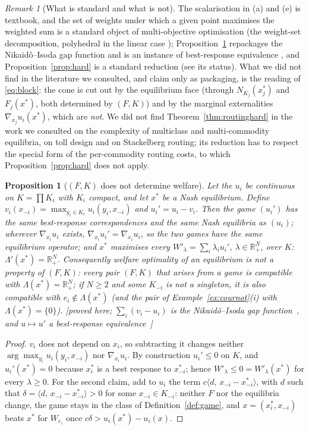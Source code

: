 \documentclass[11pt,a4paper]{article}
\theoremstyle{plain}
\newtheorem{proposition}[theorem]{Proposition}
\theoremstyle{definition}
\theoremstyle{remark}
\newtheorem{remark}[theorem]{Remark}
\newcommand{\R}{\mathbb{R}}
\newcommand{\NC}{N}
\newcommand{\ip}[2]{\langle #1,\,#2\rangle}
\newcommand{\status}[1]{\textsf{\small [#1]}}
\newcommand{\Lam}{\Lambda}
\begin{document}
\begin{remark}[What is standard and what is not]\label{rem:novelty}
The scalarisation in (a) and (e) is textbook, and the set of weights under which a given point maximises the weighted sum is a standard object of multi-objective optimisation (the weight-set decomposition, polyhedral in the linear case \citep{bensonSun2000}); Proposition~\ref{prop:notdet} repackages the Nikaid\^o--Isoda gap function and is an instance of best-response equivalence \citep{morrisUi2004}, and Proposition~\ref{prop:hard} is a standard reduction (see its status). What we did not find in the literature we consulted, and claim only as packaging, is the reading of \eqref{eq:block}: the cone is cut out by the equilibrium face (through $\NC_{K_j}(x_j^*)$ and $F_j(x^*)$, both determined by $(F,K)$) and by the marginal externalities $\nabla_{x_j}u_i(x^*)$, which are \emph{not}. We did not find Theorem~\ref{thm:routinghard} in the work we consulted on the complexity of multiclass and multi-commodity equilibria, on toll design \citep{hearnRamana1998} and on Stackelberg routing; its reduction has to respect the special form of the per-commodity routing costs, to which Proposition~\ref{prop:hard} does not apply.
\end{remark}

\begin{proposition}[$(F,K)$ does not determine welfare]\label{prop:notdet}
Let the $u_i$ be continuous on $K=\prod K_i$ with $K_i$ compact, and let $x^*$ be a Nash equilibrium. Define $v_i(x_{-i})=\max_{y_i\in K_i}u_i(y_i,x_{-i})$ and $u_i'=u_i-v_i$. Then the game $(u_i')$ has the same best-response correspondences and the same Nash equilibria as $(u_i)$; wherever $\nabla_{x_i}u_i$ exists, $\nabla_{x_i}u_i'=\nabla_{x_i}u_i$, so the two games have the same equilibrium operator; and $x^*$ maximises every $W'_\lambda=\sum_i\lambda_iu_i'$, $\lambda\in\R^N_+$, over $K$: $\Lam'(x^*)=\R^N_+$. Consequently welfare optimality of an equilibrium is not a property of $(F,K)$: every pair $(F,K)$ that arises from a game is compatible with $\Lam(x^*)=\R^N_+$; if $N\ge2$ and some $K_{-i}$ is not a singleton, it is also compatible with $e_i\notin\Lam(x^*)$ (and the pair of Example~\ref{ex:cournot}(i) with $\Lam(x^*)=\{0\}$). \status{proved here; $\sum_i(v_i-u_i)$ is the Nikaid\^o--Isoda gap function~\citep{nikaidoIsoda1955}, and $u\mapsto u'$ a best-response equivalence~\citep{morrisUi2004}}
\end{proposition}
\begin{proof}
$v_i$ does not depend on $x_i$, so subtracting it changes neither $\arg\max_{y_i}u_i(y_i,x_{-i})$ nor $\nabla_{x_i}u_i$. By construction $u_i'\le 0$ on $K$, and $u_i'(x^*)=0$ because $x_i^*$ is a best response to $x^*_{-i}$; hence $W'_\lambda\le 0=W'_\lambda(x^*)$ for every $\lambda\ge 0$. For the second claim, add to $u_i$ the term $c\ip{d}{x_{-i}-x^*_{-i}}$, with $d$ such that $\delta=\ip{d}{x_{-i}-x^*_{-i}}>0$ for some $x_{-i}\in K_{-i}$: neither $F$ nor the equilibria change, the game stays in the class of Definition~\ref{def:game}, and $x=(x_i^*,x_{-i})$ beats $x^*$ for $W_{e_i}$ once $c\delta>u_i(x^*)-u_i(x)$.
\end{proof}
\end{document}
